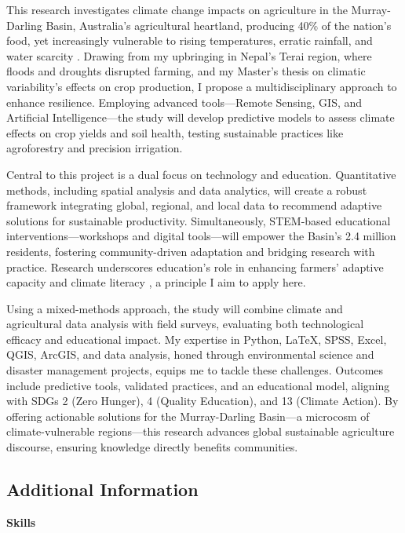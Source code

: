 This research investigates climate change impacts on agriculture in the Murray-Darling Basin, Australia’s agricultural heartland, producing 40\% of the nation’s food, yet increasingly vulnerable to rising temperatures, erratic rainfall, and water scarcity \parencite{postResearchInformingPolicy2025}. Drawing from my upbringing in Nepal’s Terai region, where floods and droughts disrupted farming, and my Master’s thesis on climatic variability’s effects on crop production, I propose a multidisciplinary approach to enhance resilience. Employing advanced tools—Remote Sensing, GIS, and Artificial Intelligence—the study will develop predictive models to assess climate effects on crop yields and soil health, testing sustainable practices like agroforestry and precision irrigation.

Central to this project is a dual focus on technology and education. Quantitative methods, including spatial analysis and data analytics, will create a robust framework integrating global, regional, and local data to recommend adaptive solutions for sustainable productivity. Simultaneously, STEM-based educational interventions—workshops and digital tools—will empower the Basin’s 2.4 million residents, fostering community-driven adaptation and bridging research with practice. Research underscores education’s role in enhancing farmers’ adaptive capacity and climate literacy \parencite{prettyIntensificationRedesignedSustainable2018}, a principle I aim to apply here.

Using a mixed-methods approach, the study will combine climate and agricultural data analysis with field surveys, evaluating both technological efficacy and educational impact. My expertise in Python, LaTeX, SPSS, Excel, QGIS, ArcGIS, and data analysis, honed through environmental science and disaster management projects, equips me to tackle these challenges. Outcomes include predictive tools, validated practices, and an educational model, aligning with SDGs 2 (Zero Hunger), 4 (Quality Education), and 13 (Climate Action). By offering actionable solutions for the Murray-Darling Basin—a microcosm of climate-vulnerable regions—this research advances global sustainable agriculture discourse, ensuring knowledge directly benefits communities.

\subsection*{Additional Information}

\textbf{Skills}

